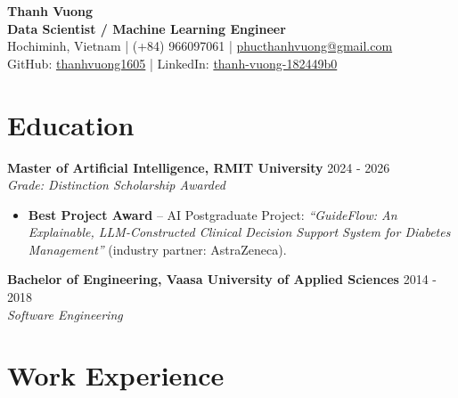 \documentclass[10pt, letterpaper]{article}
\newenvironment{zitemize}{
\begin{itemize} \itemsep 0pt \parskip 0pt \parsep 1pt}
{\end{itemize}\vspace{-.5em}}
\begin{document}
\begin{center}
    {\Large \textbf{Thanh Vuong}} \\
    \vspace{1mm}
    \textbf{Data Scientist / Machine Learning Engineer} \\
    \vspace{1mm}
    Hochiminh, Vietnam | (+84) 966097061 | \href{mailto:phucthanhvuong@gmail.com}{phucthanhvuong@gmail.com} \\
    GitHub: \href{https://github.com/thanhvuong1605}{thanhvuong1605} | LinkedIn: \href{https://www.linkedin.com/in/thanh-vuong-182449b0}{thanh-vuong-182449b0} 
\end{center}

\section{Education}
\textbf{Master of Artificial Intelligence, RMIT University} \hfill 2024 - 2026 \\
\textit{Grade: Distinction \textbar{} Scholarship Awarded}
\begin{zitemize}
    \vspace{-1mm}\item \small{\textbf{Best Project Award} -- AI Postgraduate Project: \textit{``GuideFlow: An Explainable, LLM-Constructed Clinical Decision Support System for Diabetes Management''} (industry partner: AstraZeneca).}
\end{zitemize}

\textbf{Bachelor of Engineering, Vaasa University of Applied Sciences} \hfill 2014 - 2018 \\
\textit{Software Engineering}

\section{Work Experience}
\end{document}
